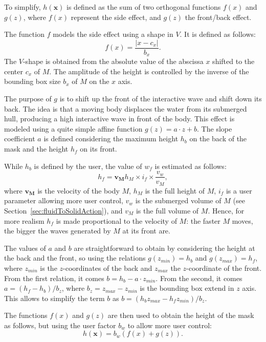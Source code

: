 \documentclass[final]{jcgt}
\begin{document}
To simplify, $h(\mathbf x)$ is defined as the sum of two orthogonal functions $f(x)$ and $g(z)$,
where $f(x)$ represent the side effect, and $g(z)$ the front/back effect.

The function $f$ models the side effect using a shape in $V$.
It is defined as follows:
\begin{equation}
	f(x) = \frac{\left|x-c_x\right|}{b_x}.
\end{equation}
The $V$-shape is obtained from the absolute value of the abscissa $x$ shifted to the center $c_x$ of $M$.
The amplitude of the height is controlled by the inverse of the bounding box size $b_x$ of $M$ on the $x$ axis.

The purpose of $g$ is to shift up the front of the interactive wave and shift down its back.
The idea is that a moving body displaces the water from its submerged hull, producing a high interactive wave in front of the body.
This effect is modeled using a quite simple affine function $g(z)=a\cdot z+b$.
The slope coefficient $a$ is defined considering the maximum height $h_b$ on the back of the mask and the height $h_f$ on its front.

While $h_b$ is defined by the user, the value of $w_f$ is estimated as follows:
\begin{equation}
	h_f = \mathbf{v_M}h_{M}\times i_f\times\frac{v_w}{v_{M}},
\end{equation}
where $\mathbf{v_M}$ is the velocity of the body $M$, $h_M$ is the full height of $M$, $i_f$ is a user parameter allowing more user control, $v_w$ is the submerged volume of $M$ (see Section~\ref{sec:fluidToSolidAction}), and $v_{M}$ is the full volume of $M$.
Hence, for more realism $h_f$ is made proportional to the velocity of $M$:
the faster $M$ moves, the bigger the waves generated by $M$ at its front are.

The values of $a$ and $b$ are straightforward to obtain by considering the height at the back and the front, so using the relations $g(z_{min})=h_b$ and $g(z_{max})=h_f$,
where $z_{min}$ is the $z$-coordinates of the back and $z_{max}$ the $z$-coordinate of the front.
From the first relation, it comes $b=h_b-a\cdot z_{min}$.
From the second, it comes $a=\left(h_f-h_b\right)/b_z$, where $b_z=z_{max}-z_{min}$ is the bounding box extend in $z$ axis.
This allows to simplify the term $b$ as $b=\left(h_bz_{max}-h_fz_{min}\right)/b_z$.

The functions $f(x)$ and $g(z)$ are then used to obtain the height of the mask as follows,
but using the user factor $b_w$ to allow more user control:
\begin{equation}
	h(\mathbf x)=b_w\left(f(x)+g(z)\right).
\end{equation}
\end{document}
